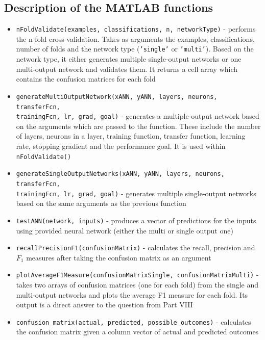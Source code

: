 \documentclass[a4paper]{article}
\begin{document}
\subsection{Description of the MATLAB functions}
\begin{itemize}
\item \texttt{nFoldValidate(examples, classifications, n, networkType)} - performs the n-fold cross-validation. Takes as arguments the examples, classifications, number of folds and the network type (\texttt{'single'} or \texttt{'multi'}). Based on the network type, it either generates multiple single-output networks or one multi-output network and validates them. It returns a cell array which contains the confusion matrices for each fold
\item \texttt{generateMultiOutputNetwork(xANN, yANN, layers, neurons, transferFcn,\\trainingFcn, lr, grad, goal)} - generates a multiple-output network based on the arguments which are passed to the function. These include the number of layers, neurons in a layer, training function, transfer function, learning rate, stopping gradient and the performance goal. It is used within \texttt{nFoldValidate()}
\item \texttt{generateSingleOutputNetworks(xANN, yANN, layers, neurons, transferFcn,\\trainingFcn, lr, grad, goal)} - generates multiple single-output networks based on the same arguments as the previous function
\item \texttt{testANN(network, inputs)} - produces a vector of predictions for the  inputs using provided neural network (either the multi or single output one)
\item \texttt{recallPrecisionF1(confusionMatrix)} - calculates the recall, precision and $F_1$ measures after taking the confusion matrix as an argument
\item \texttt{plotAverageF1Measure(confusionMatrixSingle, confusionMatrixMulti)} - takes two arrays of confusion matrices (one for each fold) from the single and multi-output networks and plots the average F1 measure for each fold. Its output is a direct answer to the question from Part VIII
\item \texttt{confusion\_matrix(actual, predicted, possible\_outcomes)} - calculates the confusion matrix given a column vector of actual and predicted outcomes
\end{itemize}

\clearpage
\end{document}
